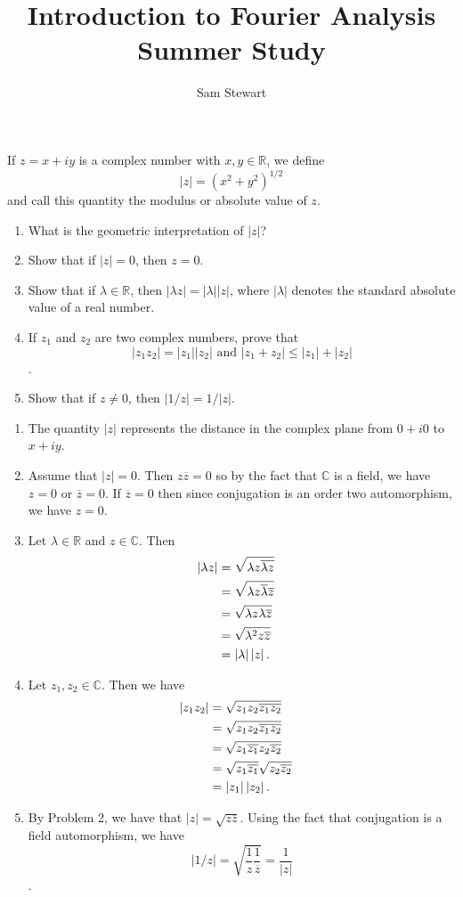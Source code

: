 \documentclass[12pt,letterpaper,boxed]{jhwhw}
\author{Sam Stewart}
\title{Introduction to Fourier Analysis Summer Study}
\newcommand{\C}{{\mathbb{C}}}
\newcommand{\R}{{\mathbb{R}}}
\newcommand{\abs}[1]{\left| #1 \right|}
\newcommand{\conj}[1]{{\overline{#1}}}
\begin{document}
If $z = x + iy$ is a complex number with $x, y \in \R$, we define
\[
	\abs{z} = (x^2 + y^2)^{1/2}
\]
and call this quantity the modulus or absolute value of $z$.

\begin{enumerate}
	\item What is the geometric interpretation of $\abs{z}$?
	\item Show that if $\abs{z} = 0$, then $z = 0$.
	\item Show that if $\lambda \in \R$, then $\abs{\lambda z} = \abs{\lambda} \abs{z}$, where $\abs{\lambda}$ denotes the standard absolute value of a real number.
	\item If $z_1$ and $z_2$ are two complex numbers, prove that
		\[
			\abs{z_1 z_2} = \abs{z_1}\abs{z_2} \textrm{ and } \abs{z_1 + z_2} \leq \abs{z_1} + \abs{z_2}
		\].
	\item Show that if $z \neq 0$, then $\abs{1/z} = 1/\abs{z}$.
\end{enumerate}

\solution
\begin{enumerate}
	\item The quantity $\abs{z}$ represents the distance in the complex plane from $0 + i0$ to $x + iy$.
	\item Assume that $\abs{z} = 0$. Then $z \conj{z} = 0$ so by the fact that $\C$ is a field, we have $z = 0$ or $\conj{z} = 0$. If $\conj{z} = 0$ then since conjugation is an order two automorphism, we have $z = 0$.
	\item Let $\lambda \in \R$ and $z \in \C$. Then
	\begin{align*}
		\abs{\lambda z} &= \sqrt{\lambda z \conj{\lambda z}} \cr
				&= \sqrt{\lambda z \conj{\lambda} \conj{z}} \cr
				&= \sqrt{\lambda z \lambda \conj{z}} \cr
				&= \sqrt{\lambda^2 z \conj{z}} \cr
				&= \abs{\lambda} \abs{z}.
	\end{align*}
	\item Let $z_1, z_2 \in \C$. Then we have
		\begin{align*}
			\abs{z_1 z_2} &= \sqrt{z_1 z_2 \conj{z_1 z_2}} \cr
				      &= \sqrt{z_1 z_2 \conj{z_1} \conj{z_2}} \cr
				      &= \sqrt{z_1 \conj{z_1} z_2 \conj{z_2}} \cr
				      &= \sqrt{z_1 \conj{z_1}} \sqrt{z_2 \conj{z_2}} \cr
				      &= \abs{z_1} \abs{z_2}.
		\end{align*}

	\item By Problem 2, we have that $\abs{z} = \sqrt{z \conj{z}}$. Using the fact that conjugation is a field automorphism, we have
		\[
			\abs{1/z} = \sqrt{\frac{1}{z} \frac{1}{\conj{z}}} = \frac{1}{\abs{z}}
		\].
\end{enumerate}
\end{document}
